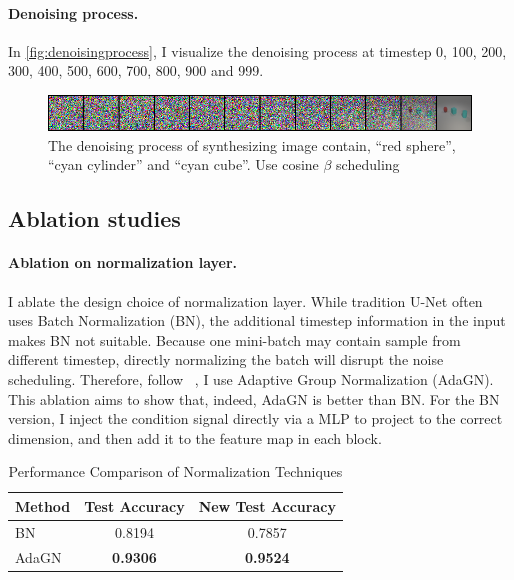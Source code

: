 \documentclass[a4paper,twocolumn]{article}
\begin{document}
\paragraph{Denoising process.} In \autoref{fig:denoisingprocess}, I visualize the denoising process at timestep 0, 100, 200, 300, 400, 500, 600, 700, 800, 900 and 999.

\begin{figure}[H]
\centering
\includegraphics[width=0.95\linewidth]{figures/denoising_process}
\caption{The denoising process of synthesizing image contain, ``red sphere'', ``cyan
cylinder'' and ``cyan cube''. Use cosine $\beta$ scheduling}
\label{fig:denoisingprocess}
\end{figure}



\subsection{Ablation studies}

\paragraph{Ablation on normalization layer.}
I ablate the design choice of normalization layer. While tradition U-Net often uses Batch Normalization (BN), the additional timestep information in the input makes BN not suitable. Because one mini-batch may contain sample from different timestep, directly normalizing the batch will disrupt the noise scheduling. Therefore, follow ~\cite{dhariwal2021diffusion}, I use Adaptive Group Normalization (AdaGN). This ablation aims to show that, indeed, AdaGN is better than BN. For the BN version, I inject the condition signal directly via a MLP to project to the correct dimension, and then add it to the feature map in each block.
\begin{table}[h]
\centering
\caption{Performance Comparison of Normalization Techniques}
\label{tab:norm_comparison}
\begin{tabular}{lcc}
\toprule
\textbf{Method} & \textbf{Test Accuracy} & \textbf{New Test Accuracy} \\
\midrule
BN & 0.8194 & 0.7857 \\
AdaGN & \textbf{0.9306} & \textbf{0.9524} \\
\bottomrule
\end{tabular}
\end{table}
\end{document}
